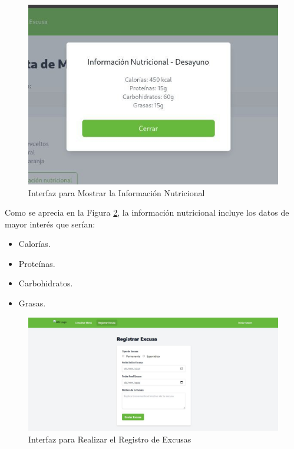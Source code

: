 \documentclass[stu, 12pt, letterpaper, donotrepeattitle, floatsintext, natbib]{apa7}
\begin{document}
\begin{figure}[H]
	\caption[]{Interfaz para Mostrar la Información Nutricional}
	\label{Interfaz para Mostrar la Información Nutricional}
	\includegraphics[width=1\linewidth]{Prototipo/Frontend_03.jpg}
\end{figure}

Como se aprecia en la Figura \ref{Interfaz para Mostrar la Información Nutricional}, la información nutricional incluye los datos de mayor interés que serían:

\begin{itemize}
	\item Calorías.
	\item Proteínas.
	\item Carbohidratos.
	\item Grasas.
\end{itemize} 

\begin{figure}[H]
	\caption[]{Interfaz para Realizar el Registro de Excusas}
	\label{Interfaz para Mostrar la Información Nutricional}
	\includegraphics[width=1\linewidth]{Prototipo/Frontend_04.jpg}
\end{figure}
\end{document}
